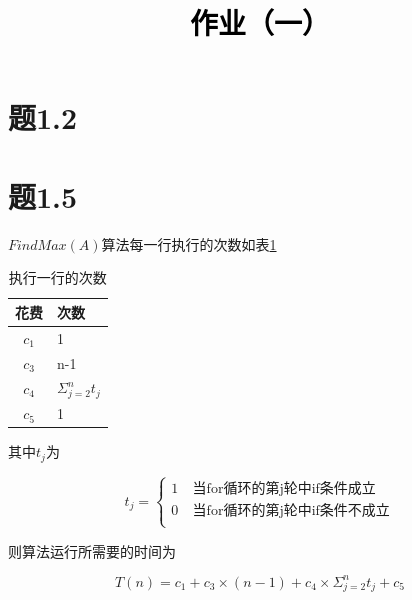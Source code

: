 \documentclass[a4paper,twoside]{article}
\newcommand{\PaperTitle}{作业（一）}  %
\begin{document}
\newpage

\title{
	\Large{\textcolor{black}{\PaperTitle}}
}
	
	
\maketitle
	
\tableofcontents
 
\newpage
\begin{spacing}{1.2}

\section{题1.2}

\section{题1.5}

$FindMax(A)$算法每一行执行的次数如表\ref{tbl:p15}

\begin{table}[h]
	\renewcommand{\arraystretch}{1.2}
	\caption{执行一行的次数}
	\label{tbl:p15}
	\begin{center}
		{\footnotesize
			\begin{tabular}{c l}
				\toprule
				{花费} & {次数} \\
				\midrule
				$c_1$ & 1 \\
				\hline
				$c_3$ & n-1 \\
				\hline
				$c_4$ & $\Sigma_{j=2}^{n}t_j$ \\
				\hline
				$c_5$ & 1 \\
				\bottomrule
		\end{tabular}}
	\end{center}
\end{table}

其中$t_j$为

$$ t_j=\left\{
\begin{aligned}
	1 & \  \mbox{当for循环的第j轮中if条件成立} \\
	0 & \  \mbox{当for循环的第j轮中if条件不成立} \\
\end{aligned}
\right.
$$

则算法运行所需要的时间为

\begin{equation}
T(n)=c_1 + c_3 \times (n-1) + c_4 \times \Sigma_{j=2}^{n}t_j + c_5 \label{eqn:tn15}
\end{equation}


\end{spacing}
\end{document}
